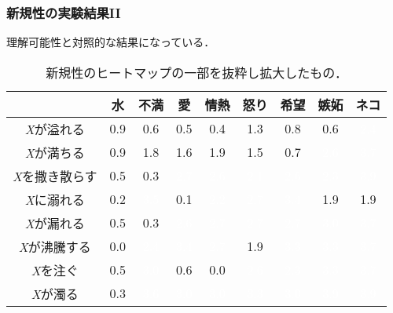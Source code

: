 \documentclass[12pt,usepdftitle=false]{beamer}
\begin{document}
\begin{frame}
    \frametitle{新規性の実験結果II}
    理解可能性と対照的な結果になっている．

    \begin{table}\centering
        \footnotesize
        \begin{tabular}{|c|c|c|c|c|c|c|c|c|}
            \hline
 & 水 & 不満 & 愛 & 情熱 & 怒り & 希望 & 嫉妬 & ネコ \\
            \hline
\emph{X}が溢れる & 0.9 & 0.6 & 0.5 & 0.4 & \cellcolor{sBlonde}1.3 & 0.8 & 0.6 & \cellcolor{sOrange}\textcolor{white}{2.4} \\
            \hline
\emph{X}が満ちる & 0.9 & \cellcolor{sBlonde}1.8 & \cellcolor{sBlonde}1.6 & \cellcolor{sBlonde}1.9 & \cellcolor{sBlonde}1.5 & 0.7 & \cellcolor{sOrange}\textcolor{white}{2.6} & \cellcolor{sDarkRed}\textcolor{white}{3.7} \\
            \hline
\emph{X}を撒き散らす & 0.5 & 0.3 & \cellcolor{sOrange}\textcolor{white}{2.7} & \cellcolor{sOrange}\textcolor{white}{2.6} & \cellcolor{sOrange}\textcolor{white}{2.1} & \cellcolor{sOrange}\textcolor{white}{2.6} & \cellcolor{sOrange}\textcolor{white}{2.3} & \cellcolor{sDarkRed}\textcolor{white}{3.9} \\
            \hline
\emph{X}に溺れる & 0.2 & \cellcolor{sDarkRed}\textcolor{white}{3.5} & 0.1 & \cellcolor{sOrange}\textcolor{white}{2.2} & \cellcolor{sOrange}\textcolor{white}{2.7} & \cellcolor{sDarkRed}\textcolor{white}{3.4} & \cellcolor{sBlonde}1.9 & \cellcolor{sBlonde}1.9 \\
            \hline
\emph{X}が漏れる & 0.5 & 0.3 & \cellcolor{sOrange}\textcolor{white}{2.6} & \cellcolor{sOrange}\textcolor{white}{2.7} & \cellcolor{sOrange}\textcolor{white}{2.7} & \cellcolor{sOrange}\textcolor{white}{2.7} & \cellcolor{sDarkRed}\textcolor{white}{3.0} & \cellcolor{sDarkRed}\textcolor{white}{3.7} \\
            \hline
\emph{X}が沸騰する & 0.0 & \cellcolor{sOrange}\textcolor{white}{2.4} & \cellcolor{sDarkRed}\textcolor{white}{3.4} & \cellcolor{sOrange}\textcolor{white}{2.7} & \cellcolor{sBlonde}1.9 & \cellcolor{sDarkRed}\textcolor{white}{3.3} & \cellcolor{sDarkRed}\textcolor{white}{3.3} & \cellcolor{sDarkRed}\textcolor{white}{3.7} \\
            \hline
\emph{X}を注ぐ & 0.5 & \cellcolor{sDarkRed}\textcolor{white}{3.0} & 0.6 & 0.0 & \cellcolor{sOrange}\textcolor{white}{2.6} & \cellcolor{sOrange}\textcolor{white}{2.3} & \cellcolor{sDarkRed}\textcolor{white}{3.3} & \cellcolor{sDarkRed}\textcolor{white}{3.7} \\
            \hline
\emph{X}が濁る & 0.3 & \cellcolor{sDarkRed}\textcolor{white}{3.6} & \cellcolor{sDarkRed}\textcolor{white}{3.0} & \cellcolor{sDarkRed}\textcolor{white}{3.0} & \cellcolor{sDarkRed}\textcolor{white}{3.3} & \cellcolor{sDarkRed}\textcolor{white}{3.0} & \cellcolor{sDarkRed}\textcolor{white}{3.9} & \cellcolor{sDarkRed}\textcolor{white}{3.9} \\
            \hline
        \end{tabular}
        \caption{新規性のヒートマップの一部を抜粋し拡大したもの．}
    \end{table}
\end{frame}
\end{document}
